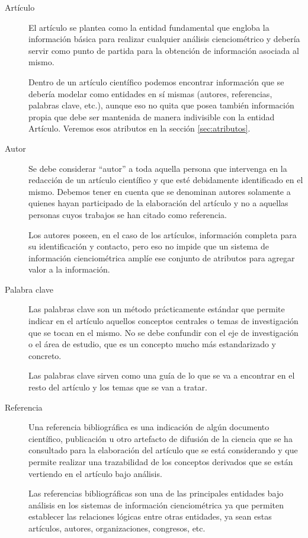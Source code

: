 \begin{description}
	\item[Artículo] El artículo se plantea como la entidad fundamental que engloba la información básica para realizar cualquier análisis cienciométrico y debería servir como punto de partida para la obtención de información asociada al mismo. 
	
	Dentro de un artículo científico podemos encontrar información que se debería modelar como entidades en sí mismas (autores, referencias, palabras clave, etc.), aunque eso no quita que posea también información propia que debe ser mantenida de manera indivisible con la entidad Artículo. Veremos esos atributos en la sección \ref{sec:atributos}.
	
	\item[Autor] Se debe considerar ``autor'' a toda aquella persona que intervenga en la redacción de un artículo científico y que esté debidamente identificado en el mismo. Debemos tener en cuenta que se denominan autores solamente a quienes hayan  participado de la elaboración del artículo y no a aquellas personas cuyos trabajos se han citado como referencia.
	
	Los autores poseen, en el caso de los artículos, información completa para su identificación y contacto, pero eso no impide que un sistema de información cienciométrica amplíe ese conjunto de atributos para agregar valor a la información.
	
	\item[Palabra clave] Las palabras clave son un método prácticamente estándar que permite indicar en el artículo aquellos conceptos centrales o temas de investigación que se tocan en el mismo. No se debe confundir con el eje de investigación o el área de estudio, que es un concepto mucho más estandarizado y concreto.
	
	Las palabras clave sirven como una guía de lo que se va a encontrar en el resto del artículo y los temas que se van a tratar.
	
	\item[Referencia] Una referencia bibliográfica es una indicación de algún documento científico, publicación u otro artefacto de difusión de la ciencia que se ha consultado para la elaboración del artículo que se está considerando y que permite realizar una trazabilidad de los conceptos derivados que se están vertiendo en el artículo bajo análisis.
	
	Las referencias bibliográficas son una de las principales entidades bajo análisis en los sistemas de información cienciométrica ya que permiten establecer las relaciones lógicas entre otras entidades, ya sean estas artículos, autores, organizaciones, congresos, etc.
	

\end{description}
